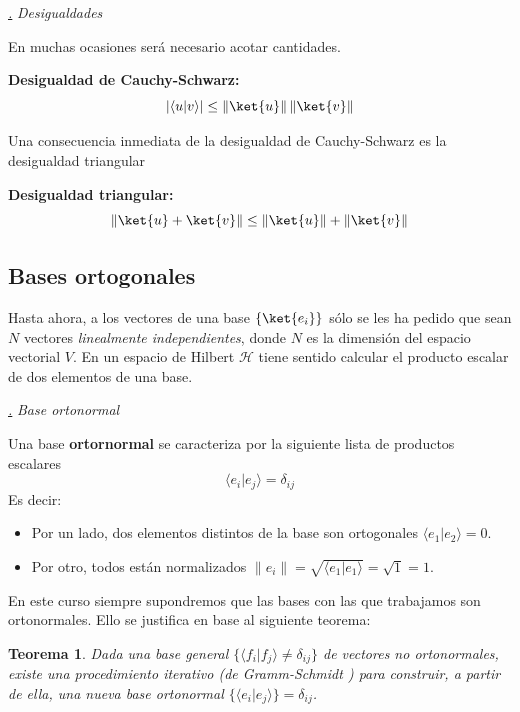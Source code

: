\documentclass[a4paper,11pt]{book} %
\newtheorem{teorema_contador}{Teorema}
\newcommand{\Teorema}[1]{
		\begin{mybox_gray2}{}
			\begin{teorema_contador}
				 #1 
			\end{teorema_contador} 
		\end{mybox_gray2}
	}
\numberwithin{equation}{chapter}
\newcommand{\braket}[2]{\langle #1|#2\rangle}
\def\subsubiContadorIt{\par\addtocounter{subsubsection}{1}\underline{\it\thesubsubsection.}\hskip0.5cm \setcounter{subsubsubsectionIt}{0}}
\newcommand{\SubsubiIt}[1]{
		\subsubiContadorIt \textit{#1}
	}
\newcounter{subsubsubsectionIt}[subsubsection]
\begin{document}
			\SubsubiIt{Desigualdades}

En muchas ocasiones será necesario acotar cantidades. 
	\begin{mybox_gray2}{}
	\textbf{Desigualdad de Cauchy-Schwarz:}
		\begin{equation}
		|\braket{u}{v}| \leq \|\ket{u}\|\, \|\ket{v}\|
		\end{equation}
	\end{mybox_gray2}

Una consecuencia inmediata  de la desigualdad de Cauchy-Schwarz es la desigualdad triangular
	\begin{mybox_gray2}{}
	\textbf{Desigualdad triangular:}
		\begin{equation}
		\|\ket{u}+\ket{v}\| \leq \|\ket{u}\|+ \|\ket{v}\|
		\end{equation}
	\end{mybox_gray2}


		\subsection{Bases ortogonales}

Hasta ahora, a los vectores de una base $\{\ket{e_i}\}$ sólo se les ha pedido que sean $N$ vectores \textit{linealmente independientes}, donde $N$ es la dimensión del espacio vectorial $V$. En un espacio de Hilbert $\mathcal{H}$ tiene sentido calcular el producto escalar de dos elementos de una base. 


			\SubsubiIt{Base ortonormal}

	\begin{mybox_gray2}{}
Una base \textbf{ortornormal} se caracteriza por la siguiente lista de productos escalares
	\begin{equation}
	\braket{e_i}{e_j} = \delta_{ij}
	\end{equation}
Es decir:
\begin{itemize}
	\item Por un lado, dos elementos distintos de la base son ortogonales $\braket{e_1}{e_2} = 0$.
	\item Por otro, todos están normalizados  $ \| e_i \| = \sqrt{\braket{e_1}{e_1}} = \sqrt{1} = 1$.
\end{itemize}
	\end{mybox_gray2}

En este curso siempre supondremos que las bases con las que trabajamos son ortonormales. Ello se justifica en base al siguiente teorema:
	\Teorema{ \label{teorema_formalismo_gramm_schmidt}
	Dada una base general $\{\braket{f_i}{f_j}\neq \delta_{ij}\}$ de vectores no ortonormales, existe una procedimiento iterativo (de Gramm-Schmidt \cite{wiki_GramSchmidt}) para construir, a partir de ella, una nueva base ortonormal $\{\braket{e_i}{e_j}\}=\delta_{ij}$.
	}
\end{document}
